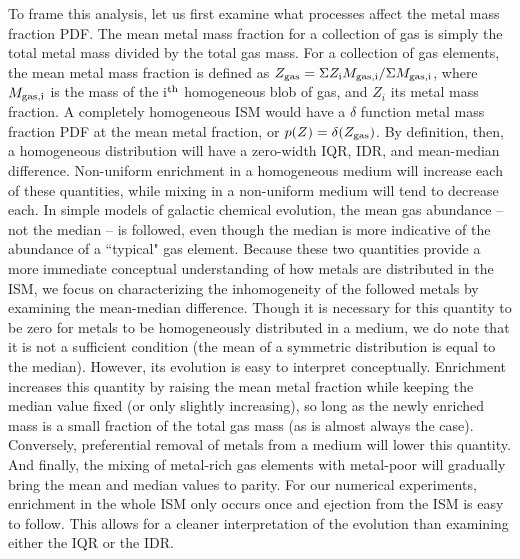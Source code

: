 To frame this analysis, let us first examine what processes affect the metal mass fraction PDF. The mean metal mass fraction for a collection of gas is simply the total metal mass divided by the total gas mass. For a collection of gas elements, the mean metal mass fraction is defined as $Z_{\rm gas} =  \Sigma Z_{\rm i}M_{\rm gas,i} / \Sigma M_{\rm gas,i}$, where $M_{\rm gas,i}$ is the mass of the i$^{\rm th}$ homogeneous blob of gas, and $Z_{i}$ its metal mass fraction. A completely homogeneous ISM would have a $\delta$ function metal mass fraction PDF at the mean metal fraction, or $p(Z) = \delta(Z_{\rm gas})$. By definition, then, a homogeneous distribution will have a zero-width IQR, IDR, and mean-median difference. Non-uniform enrichment in a homogeneous medium will increase each of these quantities, while mixing in a non-uniform medium will tend to decrease each. In simple models of galactic chemical evolution, the mean gas abundance -- not the median -- is followed, even though the median is more indicative of the abundance of a ``typical" gas element. Because these two quantities provide a more immediate conceptual understanding of how metals are distributed in the ISM, we focus on characterizing the inhomogeneity of the followed metals by examining the mean-median difference. Though it is necessary for this quantity to be zero for metals to be homogeneously distributed in a medium, we do note that it is not a sufficient condition (the mean of a symmetric distribution is equal to the median). However, its evolution is easy to interpret conceptually. Enrichment increases this quantity by raising the mean metal fraction while keeping the median value fixed (or only slightly increasing), so long as the newly enriched mass is a small fraction of the total gas mass (as is almost always the case). Conversely, preferential removal of metals from a medium will lower this quantity. And finally, the mixing of metal-rich gas elements with metal-poor will gradually bring the mean and median values to parity. For our numerical experiments, enrichment in the whole ISM only occurs once and ejection from the ISM is easy to follow. This allows for a cleaner interpretation of the evolution than examining either the IQR or the IDR.

